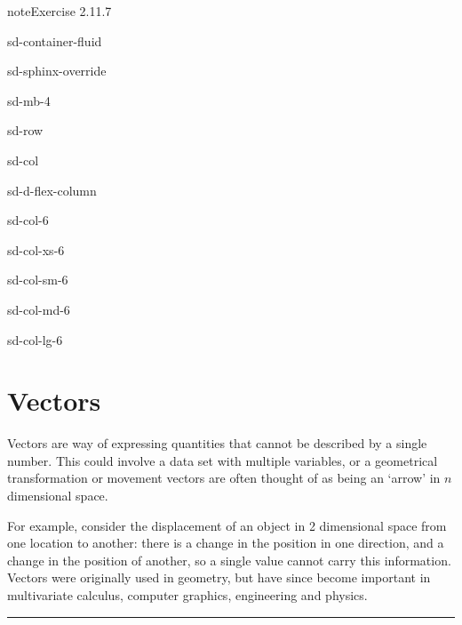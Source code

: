 \documentclass[letterpaper,10pt,english]{jupyterBook}
\begin{document}
\begin{sphinxadmonition}{note}{Exercise 2.11.7}
\begin{sphinxuseclass}{sd-container-fluid}
\begin{sphinxuseclass}{sd-sphinx-override}
\begin{sphinxuseclass}{sd-mb-4}
\begin{sphinxuseclass}{sd-row}
\begin{sphinxuseclass}{sd-col}
\begin{sphinxuseclass}{sd-d-flex-column}
\begin{sphinxuseclass}{sd-col-6}
\begin{sphinxuseclass}{sd-col-xs-6}
\begin{sphinxuseclass}{sd-col-sm-6}
\begin{sphinxuseclass}{sd-col-md-6}
\begin{sphinxuseclass}{sd-col-lg-6}
\end{sphinxuseclass}
\end{sphinxuseclass}
\end{sphinxuseclass}
\end{sphinxuseclass}
\end{sphinxuseclass}
\end{sphinxuseclass}
\end{sphinxuseclass}
\end{sphinxuseclass}
\end{sphinxuseclass}
\end{sphinxuseclass}
\end{sphinxuseclass}\end{sphinxadmonition}

\sphinxstepscope


\chapter{Vectors}
\label{\detokenize{_pages/3.0_Vectors:vectors}}\label{\detokenize{_pages/3.0_Vectors::doc}}
\ignorespaces {}\label{\detokenize{_pages/3.0_Vectors:vectors-chapter}}
\sphinxAtStartPar
Vectors are way of expressing quantities that cannot be described by a single number. This could  involve a data set with multiple variables, or a geometrical transformation or movement \sphinxhyphen{} vectors are often thought of as being an ‘arrow’ in \(n\)\sphinxhyphen{}dimensional space.

\sphinxAtStartPar
For example, consider the displacement of an object in 2 dimensional space from one location to another: there is a change in the position in one direction, and a change in the position of another, so a single value cannot carry this information. Vectors were originally used in geometry, but have since become important in multivariate calculus, computer graphics, engineering and physics.


\bigskip\hrule\bigskip


\ignorespaces 
\end{document}
